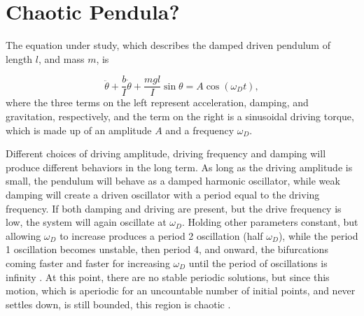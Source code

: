 \documentclass[12pt,twoside]{reedthesis}
\begin{document}

\section{Chaotic Pendula?}





The equation under study, which describes the damped driven pendulum of length $l$, and mass $m$, is

\begin{equation}
\label{damped_driven_pendulum}
 \ddot{\theta} +  \frac{b}{I} \dot{\theta} + \frac{mgl}{I}\sin{\theta} = A \cos{(\omega_D t)}, \tag{0.2}
\end{equation}
where the three terms on the left represent acceleration, damping, and gravitation, respectively, and the term on the right is a sinusoidal driving torque, which is made up of an amplitude $A$ and a frequency $\omega_D$.  

Different choices of driving amplitude, driving frequency and damping will produce different behaviors in the long term.  As long as the driving amplitude is small, the pendulum will behave as a damped harmonic oscillator, while weak damping will create a driven oscillator with a period equal to the driving frequency.  If both damping and driving are present, but the drive frequency is low, the system will again oscillate at $\omega_D$.  Holding other parameters constant, but allowing $\omega_D$ to increase produces a period 2 oscillation (half $\omega_D$), while the period 1 oscillation becomes unstable, then period 4, and onward, the bifurcations coming faster and faster for increasing $\omega_D$ until the period of oscillations is infinity \cite{bakergollub1996}.  At this point, there are no stable periodic solutions, but since this motion, which is aperiodic for an uncountable number of initial points, and never settles down, is still bounded, this region is chaotic \cite{may1976}.  
\end{document}
